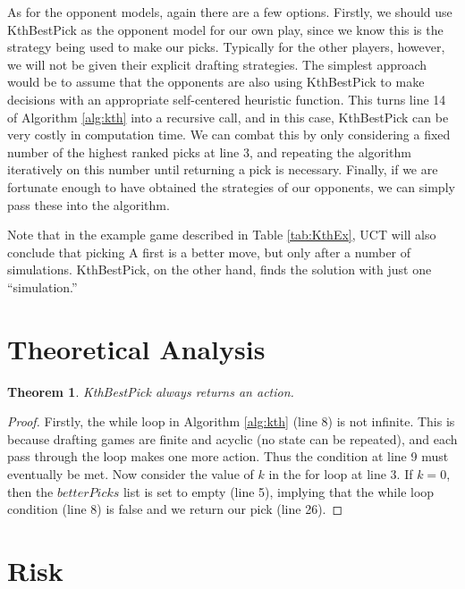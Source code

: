 \documentclass[letterpaper]{article}
\newtheorem{theorem1}{Theorem}
\numberwithin{equation}{section}
\numberwithin{theorem}{section}
\numberwithin{lemma}{section}
\numberwithin{df}{section}
\begin{document}
As for the opponent models, again there are a few options.  Firstly, we should use KthBestPick as the opponent model for our own play, since we know this is the strategy being used to make our picks.  Typically for the other players, however, we will not be given their explicit drafting strategies.  The simplest approach would be to assume that the opponents are also using KthBestPick to make decisions with an appropriate self-centered heuristic function.  This turns line 14 of Algorithm \ref{alg:kth} into a recursive call, and in this case, KthBestPick can be very costly in computation time.  We can combat this by only considering a fixed number of the highest ranked picks at line 3, and repeating the algorithm iteratively on this number until returning a pick is necessary.  Finally, if we are fortunate enough to have obtained the strategies of our opponents, we can simply pass these into the algorithm.

Note that in the example game described in Table \ref{tab:KthEx}, UCT will also conclude that picking A first is a better move, but only after a number of simulations.  KthBestPick, on the other hand, finds the solution with just one ``simulation.''

\section{Theoretical Analysis}

\begin{theorem1}
	\label{thm:Kth}
	KthBestPick always returns an action.
\end{theorem1}
\begin{proof}
Firstly, the while loop in Algorithm \ref{alg:kth} (line 8) is not infinite.  This is because drafting games are finite and acyclic (no state can be repeated), and each pass through the loop makes one more action.  Thus the condition at line 9 must eventually be met.  Now consider the value of $k$ in the for loop at line 3.  If $k = 0$, then the $betterPicks$ list is set to empty (line 5), implying that the while loop condition (line 8) is false and we return our pick (line 26).
\end{proof}

\section{Risk}
\end{document}

